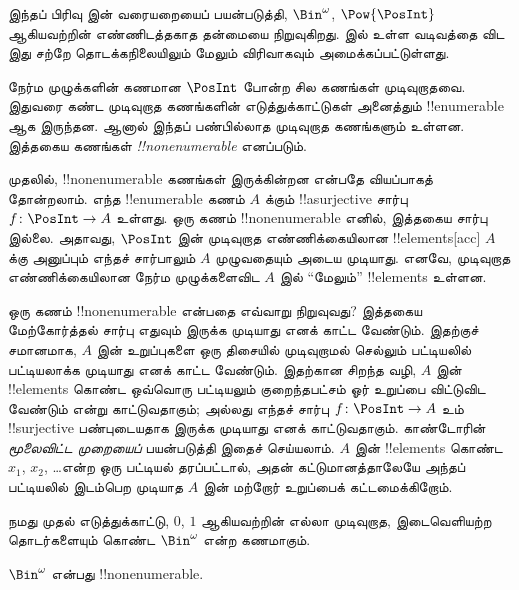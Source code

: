 \documentclass[../../../include/open-logic-section]{subfiles}
\begin{document}


\begin{editorial}
இந்தப் பிரிவு  இன் வரையறையைப் பயன்படுத்தி,
$\Bin^\omega$, $\Pow{\PosInt}$ ஆகியவற்றின் எண்ணிடத்தகாத
தன்மையை நிறுவுகிறது.
 இல் உள்ள வடிவத்தை விட இது சற்றே
தொடக்கநிலையிலும் மேலும் விரிவாகவும் அமைக்கப்பட்டுள்ளது.
\end{editorial}

நேர்ம முழுக்களின் கணமான $\PosInt$ போன்ற சில கணங்கள் முடிவுறாதவை.
இதுவரை கண்ட முடிவுறாத கணங்களின் எடுத்துக்காட்டுகள் அனைத்தும்
!!{enumerable} ஆக இருந்தன. ஆனால் இந்தப் பண்பில்லாத முடிவுறாத
கணங்களும் உள்ளன. இத்தகைய கணங்கள்
\emph{!!{nonenumerable}} எனப்படும்.

முதலில், !!{nonenumerable} கணங்கள் இருக்கின்றன என்பதே
வியப்பாகத் தோன்றலாம்.
எந்த !!{enumerable} கணம் $A$ க்கும்
!!a{surjective} சார்பு $f \colon \PosInt \to A$ உள்ளது.
ஒரு கணம் !!{nonenumerable} எனில், இத்தகைய சார்பு இல்லை.
அதாவது, $\PosInt$ இன் முடிவுறாத எண்ணிக்கையிலான !!{element}s[acc]
$A$ க்கு அனுப்பும் எந்தச் சார்பாலும் $A$ முழுவதையும் அடைய முடியாது.
எனவே, முடிவுறாத எண்ணிக்கையிலான நேர்ம முழுக்களைவிட
$A$ இல் “மேலும்” !!{element}s உள்ளன.

ஒரு கணம் !!{nonenumerable} என்பதை எவ்வாறு நிறுவுவது?
இத்தகைய மேற்கோர்த்தல் சார்பு எதுவும் இருக்க முடியாது எனக் காட்ட வேண்டும்.
இதற்குச் சமானமாக, $A$ இன் உறுப்புகளை ஒரு திசையில் முடிவுறாமல்
செல்லும் பட்டியலில் பட்டியலாக்க முடியாது எனக் காட்ட வேண்டும்.
இதற்கான சிறந்த வழி, $A$ இன் !!{element}s கொண்ட ஒவ்வொரு பட்டியலும்
குறைந்தபட்சம் ஓர் உறுப்பை விட்டுவிட வேண்டும் என்று காட்டுவதாகும்;
அல்லது எந்தச் சார்பு $f\colon \PosInt \to A$ உம்
!!{surjective} பண்புடையதாக இருக்க முடியாது எனக் காட்டுவதாகும்.
காண்டோரின் \emph{மூலைவிட்ட முறையைப்} பயன்படுத்தி இதைச் செய்யலாம்.
$A$ இன் !!{element}s கொண்ட $x_1$, $x_2$, \dots என்ற
ஒரு பட்டியல் தரப்பட்டால், அதன் கட்டுமானத்தாலேயே அந்தப் பட்டியலில்
இடம்பெற முடியாத $A$ இன் மற்றோர் உறுப்பைக் கட்டமைக்கிறோம்.

நமது முதல் எடுத்துக்காட்டு, $0$, $1$ ஆகியவற்றின் எல்லா முடிவுறாத,
இடைவெளியற்ற தொடர்களையும் கொண்ட $\Bin^\omega$ என்ற கணமாகும்.

\begin{thm}
$\Bin^\omega$ என்பது !!{nonenumerable}.
\end{thm}
\end{document}
